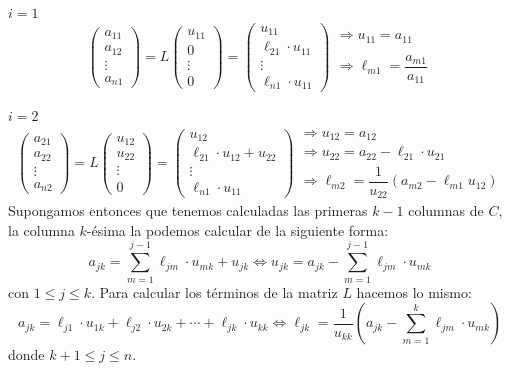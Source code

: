 \begin{met}
\underline{$i=1$}
$$\begin{pmatrix}
    a_{11} \\ a_{12} \\ \vdots \\ a_{n1}
\end{pmatrix}=L\begin{pmatrix}
    u_{11} \\ 0 \\ \vdots \\ 0
\end{pmatrix}= \begin{pmatrix}
    u_{11} \\ \ell_{21} \cdot u_{11} \\ \vdots \\ \ell_{n1} \cdot u_{11}
\end{pmatrix} \begin{array}{l}
      \Rightarrow u_{11}=a_{11} \\
      \\ 
      \Rightarrow \ell_{m1}=\dfrac{a_{m1}}{a_{11}}
\end{array} $$

\underline{$i=2$}
$$\begin{pmatrix}
    a_{21} \\ a_{22} \\ \vdots \\ a_{n2}
\end{pmatrix}=L\begin{pmatrix}
    u_{12} \\ u_{22} \\ \vdots \\ 0
\end{pmatrix}= \begin{pmatrix}
    u_{12} \\ \ell_{21} \cdot u_{12}+u_{22} \\ \vdots \\ \ell_{n1} \cdot u_{11}
\end{pmatrix}\begin{array}{l}
      \Rightarrow u_{12}=a_{12} \\ 
     \Rightarrow u_{22}=a_{22}-\ell_{21}\cdot u_{21}\\
      \Rightarrow \ell_{m2}=\dfrac{1}{u_{22}} (a_{m2}-\ell_{m1}u_{12})
\end{array}$$
Supongamos entonces que tenemos calculadas las primeras $k-1$ columnas de $C$, la columna $k$-ésima la podemos calcular de la siguiente forma:
$$a_{jk}=\sum_{m=1}^{j-1}\ell_{jm}\cdot u_{mk}+u_{jk}\Longleftrightarrow u_{jk}=a_{jk}-\sum_{m=1}^{j-1}\ell_{jm}\cdot u_{mk}$$
con $1\leq j\leq k$. Para calcular los términos de la matriz $L$ hacemos lo mismo:
$$a_{jk}=\ell_{j1}\cdot u_{1k}+\ell_{j2}\cdot u_{2k}+\cdots+\ell_{jk}\cdot u_{kk}\Longleftrightarrow \ell_{jk}=\dfrac{1}{u_{kk}}\left(a_{jk}-\sum_{m=1}^k\ell_{jm}\cdot u_{mk}\right)$$
donde $k+1\leq j\leq n$.
\end{met}
